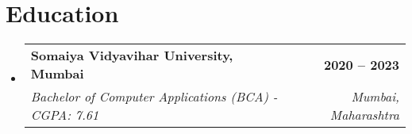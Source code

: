 \documentclass[letterpaper,9pt]{article}
\makeatletter
\newcommand{\resumeItem}[1]{
  \item\small{#1\vspace{-2pt}}
}
\newcommand{\resumeSubheading}[4]{
  \vspace{-2pt}\item
    \begin{tabular*}{1.0\textwidth}[t]{l@{\extracolsep{\fill}}r}
      \textbf{\color{darkgray}#1} & \textbf{\small\color{lightgray}#2} \\
      \textit{\small #3} & \textit{\small\color{lightgray}#4} \\
    \end{tabular*}\vspace{-5pt}
}
\newcommand{\resumeSubHeadingListStart}{\begin{itemize}[leftmargin=0.15in, label={}]}
\newcommand{\resumeSubHeadingListEnd}{\end{itemize}}
\newcommand{\resumeItemListStart}{\begin{itemize}[leftmargin=0.15in, label=\textcolor{primaryblue}{\textbullet}, itemsep=0pt, parsep=0pt]}
\newcommand{\resumeItemListEnd}{\end{itemize}\vspace{-3pt}}
\makeatother
\begin{document}
\section{Education}
\resumeSubHeadingListStart
    \resumeSubheading
      {Somaiya Vidyavihar University, Mumbai}{2020 -- 2023}
      {Bachelor of Computer Applications (BCA) - CGPA: 7.61}{Mumbai, Maharashtra}
\resumeSubHeadingListEnd



\end{document}
